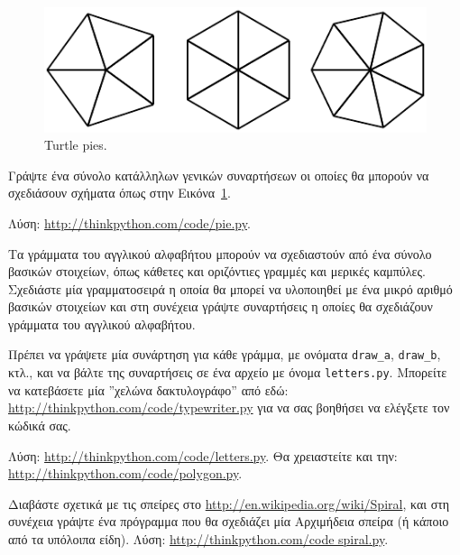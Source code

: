 \documentclass[10pt]{book}
\begin{document}
\begin{figure}
\centerline
{\includegraphics[scale=0.8]{figs/pies.pdf}}
\caption{Turtle pies.}
\label{fig.pies}
\end{figure}


\begin{exercise}

Γράψτε ένα σύνολο κατάλληλων γενικών συναρτήσεων οι οποίες θα μπορούν να σχεδιάσουν σχήματα όπως στην Εικόνα~\ref{fig.pies}.

Λύση: \url{http://thinkpython.com/code/pie.py}.
\\
\end{exercise}

\begin{exercise}

Τα γράμματα του αγγλικού αλφαβήτου μπορούν να σχεδιαστούν από ένα σύνολο βασικών στοιχείων, όπως κάθετες και οριζόντιες γραμμές και μερικές καμπύλες. Σχεδιάστε μία γραμματοσειρά η οποία θα μπορεί να υλοποιηθεί με ένα μικρό αριθμό βασικών στοιχείων και στη συνέχεια γράψτε συναρτήσεις η οποίες θα σχεδιάζουν γράμματα του αγγλικού αλφαβήτου.

Πρέπει να γράψετε μία συνάρτηση για κάθε γράμμα, με ονόματα  \verb"draw_a", \verb"draw_b",  κτλ., και να βάλτε της συναρτήσεις σε ένα αρχείο με όνομα {\tt letters.py}.  Μπορείτε να κατεβάσετε μία ''χελώνα δακτυλογράφο'' από εδώ: \url{http://thinkpython.com/code/typewriter.py} για να σας βοηθήσει να ελέγξετε τον κώδικά σας.

Λύση: \url{http://thinkpython.com/code/letters.py}. Θα χρειαστείτε και την:
\url{http://thinkpython.com/code/polygon.py}.
\\
\end{exercise}


\begin{exercise}

Διαβάστε σχετικά με τις σπείρες στο  \url{http://en.wikipedia.org/wiki/Spiral},  και στη συνέχεια γράψτε ένα πρόγραμμα που θα σχεδιάζει μία Αρχιμήδεια σπείρα (ή κάποιο από τα υπόλοιπα είδη). Λύση: \url{http://thinkpython.com/code spiral.py}.

\end{exercise}
\end{document}
